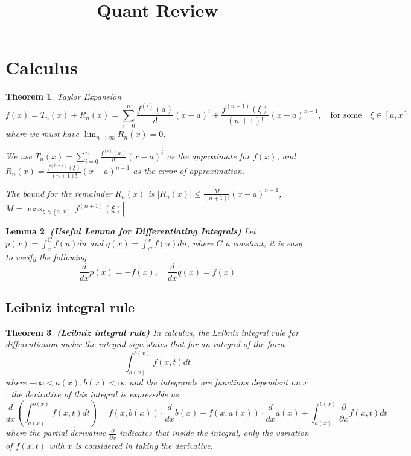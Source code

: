 \documentclass[14pt]{article}
\newtheorem{theorem}{Theorem}[section]
\newtheorem{lemma}[theorem]{Lemma}
\theoremstyle{definition}
\theoremstyle{remark}
\begin{document}
\begin{center}
    \title{Quant Review}

    {}


\end{center}

\tableofcontents
\newpage

\vspace{2em}


\section{Calculus}
\begin{theorem} Taylor Expansion
    \[f(x) = T_n(x) + R_n(x) = \sum_{i=0}^{n} \frac{f^{(i)}(a)}{i!}(x-a)^i + \frac{f^{(n+1)}(\xi)}{(n+1)!}(x-a)^{n+1}, \quad \text{for some} \quad\xi\in [a, x]\]
    where we must have $\lim_{n\to \infty} R_n(x) = 0$.

    We use $T_n(x)=\sum_{i=0}^{n} \frac{f^{(i)}(a)}{i!}(x-a)^i$ as the approximate for $f(x)$, and $R_n(x)= \frac{f^{(n+1)}(\xi)}{(n+1)!}(x-a)^{n+1}$ as the error of approximation.

    The bound for the remainder $R_n(x)$ is $|R_n(x)| \le \frac{M}{(n+1)!}(x-a)^{n+1}$, $M = \max_{\xi\in[a,x]} |f^{(n+1)}(\xi)|$.
\end{theorem}
\begin{lemma}\label{lemma:Useful Lemma for Differentiating Integrals}\textbf{(Useful Lemma for Differentiating Integrals)}
    Let $p(x)=\int_x^C f(u) d u$ and $q(x)=\int_C^x f(u) d u$, where $C$ a constant, it is easy to verify the following.
    $$
        \frac{d}{d x} p(x)=-f(x), \quad \frac{d}{d x} q(x)=f(x)
    $$
\end{lemma}

\subsection{Leibniz integral rule}
\begin{theorem}\textbf{(Leibniz integral rule)}
    In calculus, the Leibniz integral rule for differentiation under the integral sign states that for an integral of the form
    $$
        \int_{a(x)}^{b(x)} f(x, t) d t
    $$
    where $-\infty<a(x), b(x)<\infty$ and the integrands are functions dependent on $x$, the derivative of this integral is expressible as
    $$
        \frac{d}{d x}\left(\int_{a(x)}^{b(x)} f(x, t) d t\right) =f(x, b(x)) \cdot \frac{d}{d x} b(x)-f(x, a(x)) \cdot \frac{d}{d x} a(x)+\int_{a(x)}^{b(x)} \frac{\partial}{\partial x} f(x, t) d t
    $$
    where the partial derivative $\frac{\partial}{\partial x}$ indicates that inside the integral, only the variation of $f(x, t)$ with $x$ is considered in taking the derivative.
\end{theorem}
\end{document}
